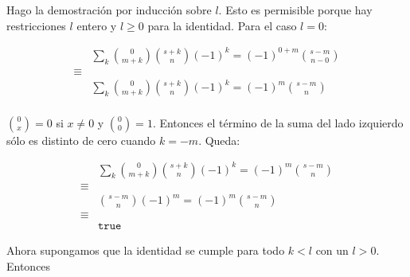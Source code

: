 \documentclass{article}
\begin{document}
\newpage
\section{}

Hago la demostración por inducción sobre $l$. Esto es permisible porque hay
restricciones $l$ entero y $l \geq 0$ para la identidad. Para el caso $l = 0$:


\begin{align*}
  & \sum_k \binom{0}{m+k} \binom{s+k}{n} (-1)^k = (-1)^{0+m} \binom{s-m}{n-0} \\
  \equiv & \\
  & \sum_k \binom{0}{m+k} \binom{s+k}{n} (-1)^k = (-1)^m \binom{s-m}{n} \\
\end{align*}

$\binom{0}{x} = 0$ si $x \neq 0$ y $\binom{0}{0} = 1$. Entonces el término de la
suma del lado izquierdo sólo es distinto de cero cuando $k = -m$. Queda:

\begin{align*}
  & \sum_k \binom{0}{m+k} \binom{s+k}{n} (-1)^k = (-1)^m \binom{s-m}{n} \\
  \equiv & \\
  & \binom{s-m}{n} (-1)^m = (-1)^m \binom{s-m}{n} \\
  \equiv & \\
  & \mathtt{true}
\end{align*}

Ahora supongamos que la identidad se cumple para todo $k < l$ con un
$l > 0$. Entonces
\end{document}
